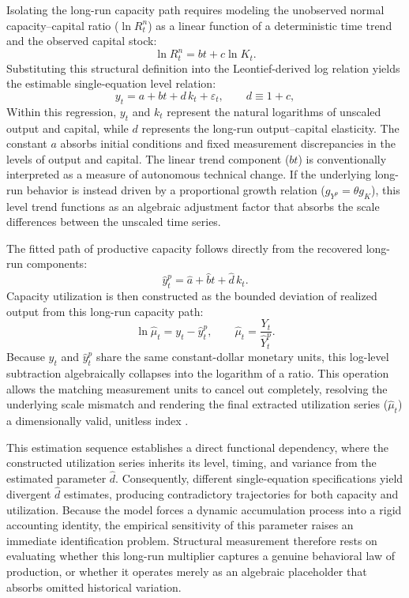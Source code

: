 \documentclass[11pt]{article}
\begin{document}
Isolating the long-run capacity path requires modeling the unobserved normal capacity--capital ratio ($\ln R^n_t$) as a linear function of a deterministic time trend and the observed capital stock:
\begin{equation}
\ln R^n_t = bt + c \ln K_t.
\end{equation}
Substituting this structural definition into the Leontief-derived log relation yields the estimable single-equation level relation:
\begin{equation}
\label{eq:shaikh_regression}
y_t = a + bt + d\,k_t + \varepsilon_t,
\qquad d \equiv 1+c,
\end{equation}
Within this regression, $y_t$ and $k_t$ represent the natural logarithms of unscaled output and capital, while $d$ represents the long-run output--capital elasticity. The constant $a$ absorbs initial conditions and fixed measurement discrepancies in the levels of output and capital. The linear trend component ($bt$) is conventionally interpreted as a measure of autonomous technical change. If the underlying long-run behavior is instead driven by a proportional growth relation ($g_{Y^p} = \theta g_K$), this level trend functions as an algebraic adjustment factor that absorbs the scale differences between the unscaled time series.

The fitted path of productive capacity follows directly from the recovered long-run components:
\begin{equation}
\label{eq:fitted_capacity}
\hat{y}^p_t = \hat{a} + \hat{b}t + \hat{d}\,k_t.
\end{equation}
Capacity utilization is then constructed as the bounded deviation of realized output from this long-run capacity path:
\begin{equation}
\label{eq:constructed_utilization}
\ln \hat{\mu}_t = y_t - \hat{y}^p_t,
\qquad
\hat{\mu}_t = \frac{Y_t}{\hat{Y}^p_t}.
\end{equation}
Because $y_t$ and $\hat{y}^p_t$ share the same constant-dollar monetary units, this log-level subtraction algebraically collapses into the logarithm of a ratio. This operation allows the matching measurement units to cancel out completely, resolving the underlying scale mismatch and rendering the final extracted utilization series ($\hat{\mu}_t$) a dimensionally valid, unitless index \citep{Basu2022dimensional}.

This estimation sequence establishes a direct functional dependency, where the constructed utilization series inherits its level, timing, and variance from the estimated parameter $\hat{d}$. Consequently, different single-equation specifications yield divergent $\hat{d}$ estimates, producing contradictory trajectories for both capacity and utilization. Because the model forces a dynamic accumulation process into a rigid accounting identity, the empirical sensitivity of this parameter raises an immediate identification problem. Structural measurement therefore rests on evaluating whether this long-run multiplier captures a genuine behavioral law of production, or whether it operates merely as an algebraic placeholder that absorbs omitted historical variation.
\end{document}
